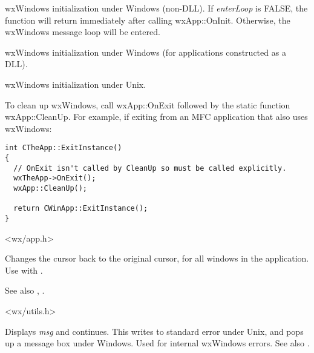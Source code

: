 
wxWindows initialization under Windows (non-DLL). If {\it enterLoop} is FALSE, the
function will return immediately after calling wxApp::OnInit. Otherwise, the wxWindows
message loop will be entered.


wxWindows initialization under Windows (for applications constructed as a DLL).


wxWindows initialization under Unix.


To clean up wxWindows, call wxApp::OnExit followed by the static function
wxApp::CleanUp. For example, if exiting from an MFC application that also uses wxWindows:

\begin{verbatim}
int CTheApp::ExitInstance()
{
  // OnExit isn't called by CleanUp so must be called explicitly.
  wxTheApp->OnExit();
  wxApp::CleanUp();

  return CWinApp::ExitInstance();
}
\end{verbatim}


<wx/app.h>

\label{wxendbusycursor}


Changes the cursor back to the original cursor, for all windows in the application.
Use with .

See also , .


<wx/utils.h>

\label{wxerror}


Displays {\it msg} and continues. This writes to standard error under
Unix, and pops up a message box under Windows. Used for internal
wxWindows errors. See also .


